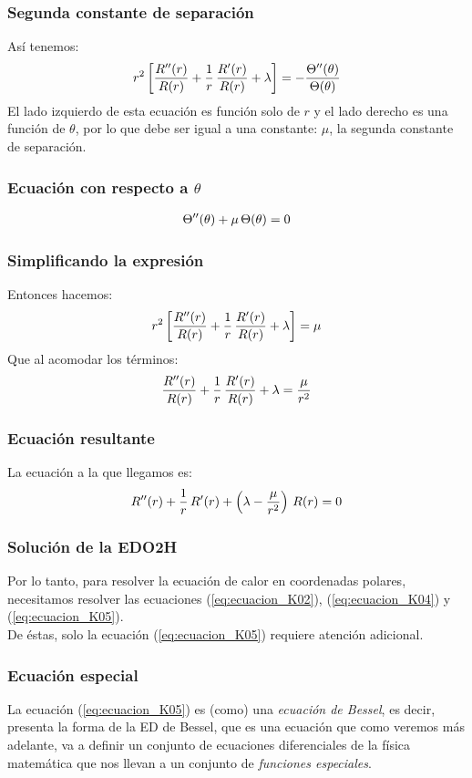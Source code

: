\documentclass[12pt]{beamer}
\begin{document}
\begin{frame}
\frametitle{Segunda constante de separación}
Así tenemos:
\pause
\begin{align}
r^{2} \left[ \dfrac{{R}^{\prime \prime} (r)}{R (r)} + \dfrac{1}{r} \, \dfrac{{R}^{\prime} (r)}{R (r)} + \lambda \right] = - \dfrac{{\Theta}^{\prime \prime} (\theta)}{\Theta (\theta)}
\label{eq:ecuacion_K03}    
\end{align}
El lado izquierdo de esta ecuación es función solo de $r$ y el lado derecho es una función de $\theta$, por lo que debe ser igual a una constante: $\mu$, la segunda constante de separación.
\end{frame}
\begin{frame}
\frametitle{Ecuación con respecto a $\theta$}
\begin{align}
{\Theta}^{\prime \prime} (\theta) + \mu \, \Theta (\theta) = 0
\label{eq:ecuacion_K04}    
\end{align}
\end{frame}
\begin{frame}
\frametitle{Simplificando la expresión}
Entonces hacemos:
\pause
\begin{align*}
r^{2} \left[ \dfrac{{R}^{\prime \prime} (r)}{R (r)} + \dfrac{1}{r} \, \dfrac{{R}^{\prime} (r)}{R (r)} + \lambda \right] = \mu
\end{align*}
\pause
Que al acomodar los términos:
\pause
\begin{align*}
\dfrac{{R}^{\prime \prime} (r)}{R (r)} + \dfrac{1}{r} \, \dfrac{{R}^{\prime} (r)}{R (r)} + \lambda = \dfrac{\mu}{r^{2}}
\end{align*}
\end{frame}
\begin{frame}
\frametitle{Ecuación resultante}
La ecuación a la que llegamos es:
\pause
\begin{align}
{R}^{\prime \prime} (r) + \dfrac{1}{r} \, {R}^{\prime} (r) + \left( \lambda - \dfrac{\mu}{r^{2}} \right) \, R(r) = 0
\label{eq:ecuacion_K05}    
\end{align}
\end{frame}
\begin{frame}
\frametitle{Solución de la EDO2H}
Por lo tanto, para resolver la ecuación de calor en coordenadas polares, necesitamos resolver las ecuaciones (\ref{eq:ecuacion_K02}), (\ref{eq:ecuacion_K04}) y (\ref{eq:ecuacion_K05}).
\\
\bigskip
\pause
De éstas, solo la ecuación (\ref{eq:ecuacion_K05}) requiere atención adicional.
\end{frame}
\begin{frame}
\frametitle{Ecuación especial}
La ecuación (\ref{eq:ecuacion_K05}) es (como) una \emph{ecuación de Bessel}, es decir, presenta la forma de la ED de Bessel, que es una ecuación que como veremos más adelante, va a definir un conjunto de ecuaciones diferenciales de la física matemática que nos llevan a un conjunto de \emph{funciones especiales}.
\end{frame}
\end{document}
